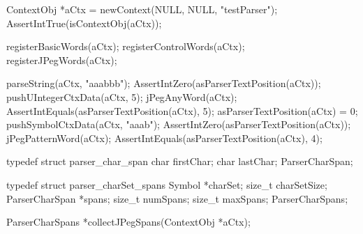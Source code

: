 
\startCTest
  ContextObj *aCtx = newContext(NULL, NULL, "testParser");
  AssertIntTrue(isContextObj(aCtx));
  
  registerBasicWords(aCtx);
  registerControlWords(aCtx);
  registerJPegWords(aCtx);

  parseString(aCtx, "aaabbb");
  AssertIntZero(asParserTextPosition(aCtx));
  pushUIntegerCtxData(aCtx, 5);
  jPegAnyWord(aCtx);
  AssertIntEquals(asParserTextPosition(aCtx), 5);
  asParserTextPosition(aCtx) = 0;
  pushSymbolCtxData(aCtx, "aaab");
  AssertIntZero(asParserTextPosition(aCtx));
  jPegPatternWord(aCtx);
  AssertIntEquals(asParserTextPosition(aCtx), 4);
\stopCTest
\stopTestCase
\stopTestSuite



\startCHeader
typedef struct parser_char_span {
  char firstChar;
  char lastChar;
} ParserCharSpan;

typedef struct parser_charSet_spans {
  Symbol         *charSet;
  size_t          charSetSize;
  ParserCharSpan *spans;
  size_t          numSpans;
  size_t          maxSpans;
} ParserCharSpans;

ParserCharSpans *collectJPegSpans(ContextObj *aCtx);
\stopCHeader

